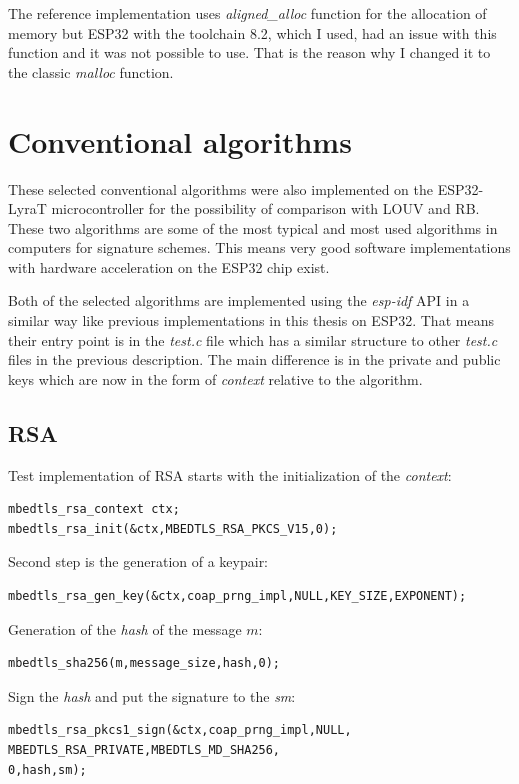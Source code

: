 \documentclass[thesis=M,english]{FITthesis}[2019/12/23]
\begin{document}
\bigskip
\noindent
The reference implementation uses \textit{aligned\_alloc} function for the allocation of memory but ESP32 with the toolchain 8.2, which I used, had an issue with this function and it was not possible to use. That is the reason why I changed it to the classic \textit{malloc} function.

\newpage
\section{Conventional algorithms}
These selected conventional algorithms were also implemented on the ESP32-LyraT microcontroller for the possibility of comparison with LOUV and RB. These two algorithms are some of the most typical and most used algorithms in computers for signature schemes. This means very good software implementations with hardware acceleration on the ESP32 chip exist. 

\bigskip
\noindent
Both of the selected algorithms are implemented using the \textit{esp-idf} API in a similar way like previous implementations in this thesis on ESP32. That means their entry point is in the \textit{test.c} file which has a similar structure to other \textit{test.c} files in the previous description. The main difference is in the private and public keys which are now in the form of \textit{context} relative to the algorithm.

\subsection{RSA}
Test implementation of RSA starts with the initialization of the \textit{context}:
\begin{lstlisting}[frame=single]
mbedtls_rsa_context ctx;
mbedtls_rsa_init(&ctx,MBEDTLS_RSA_PKCS_V15,0);
\end{lstlisting}

\noindent
Second step is the generation of a keypair:
\begin{lstlisting}[frame=single]
mbedtls_rsa_gen_key(&ctx,coap_prng_impl,NULL,KEY_SIZE,EXPONENT);
\end{lstlisting}

\noindent
Generation of the \textit{hash} of the message $m$:
\begin{lstlisting}[frame=single]
mbedtls_sha256(m,message_size,hash,0);
\end{lstlisting}

\noindent
Sign the \textit{hash} and put the signature to the \textit{sm}:
\begin{lstlisting}[frame=single]
mbedtls_rsa_pkcs1_sign(&ctx,coap_prng_impl,NULL,
MBEDTLS_RSA_PRIVATE,MBEDTLS_MD_SHA256,
0,hash,sm);
\end{lstlisting}
\end{document}
